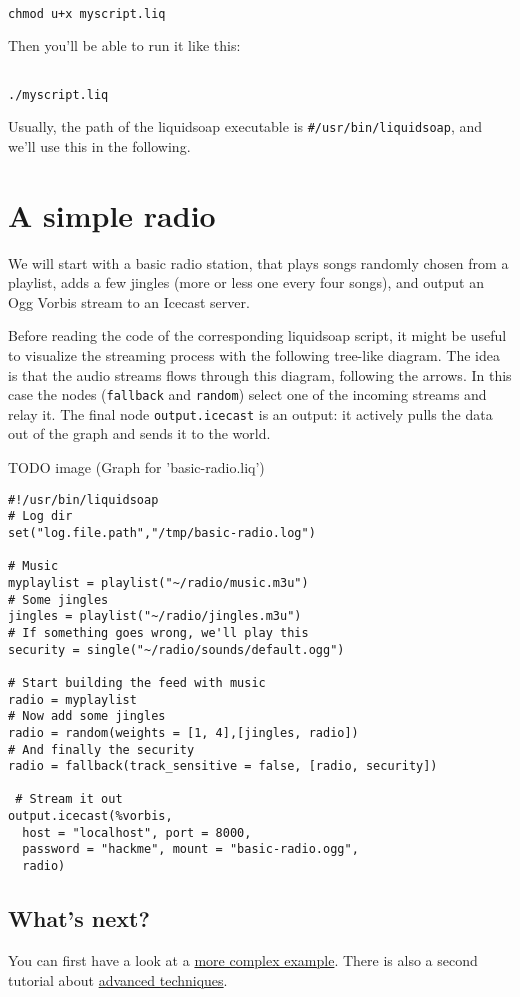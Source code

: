 \documentclass{book}
\begin{document}
\begin{verbatim}

chmod u+x myscript.liq
\end{verbatim}
Then you'll be able to run it like this:

\begin{verbatim}

./myscript.liq
\end{verbatim}
Usually, the path of the liquidsoap executable is \verb+#/usr/bin/liquidsoap+,
and we'll use this in the following.

\section{A simple radio}
We will start with a basic radio station, that plays songs randomly chosen from
a playlist, adds a few jingles (more or less one every four songs), and output
an Ogg Vorbis stream to an Icecast server.

Before reading the code of the corresponding liquidsoap script, it might be
useful to visualize the streaming process with the following tree-like
diagram. The idea is that the audio streams flows through this diagram,
following the arrows. In this case the nodes (\verb+fallback+ and \verb+random+)
select one of the incoming streams and relay it. The final node
\verb+output.icecast+ is an output: it actively pulls the data out of the graph
and sends it to the world.

TODO image (Graph for 'basic-radio.liq')

\begin{verbatim}
#!/usr/bin/liquidsoap
# Log dir
set("log.file.path","/tmp/basic-radio.log")

# Music
myplaylist = playlist("~/radio/music.m3u")
# Some jingles
jingles = playlist("~/radio/jingles.m3u")
# If something goes wrong, we'll play this
security = single("~/radio/sounds/default.ogg")

# Start building the feed with music
radio = myplaylist
# Now add some jingles
radio = random(weights = [1, 4],[jingles, radio])
# And finally the security
radio = fallback(track_sensitive = false, [radio, security])

 # Stream it out
output.icecast(%vorbis,
  host = "localhost", port = 8000,
  password = "hackme", mount = "basic-radio.ogg",
  radio)
\end{verbatim}

\subsection{What's next?}
You can first have a look at a \href{complete_case.html}{more complex
  example}. There is also a second tutorial about \href{advanced.html}{advanced
  techniques}.
\end{document}
